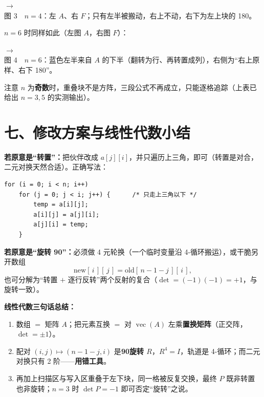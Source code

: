 \documentclass[11pt,a4paper,UTF8]{ctexart}
\begin{document}
\begin{center}
\begin{minipage}{0.96\linewidth}
\centering
{\footnotesize
\MatAfour \hspace{0.5cm}$\longrightarrow$\hspace{0.5cm}\MatFfour}\\[2pt]
{\small 图 3\ \ $n=4$：左 $A$、右 $F$；只有左半被搬动，右上不动，右下为左上块的 180\textdegree。}
\end{minipage}
\end{center}

$n=6$ 时同样如此（左图 $A$，右图 $F$）：
\begin{center}
\begin{minipage}{0.96\linewidth}
\centering
{\footnotesize
\MatA \hspace{0.35cm}$\longrightarrow$\hspace{0.35cm}\MatF}\\[2pt]
{\small 图 4\ \ $n=6$：蓝色左半来自 $A$ 的下半（翻转为行、再转置成列），右侧为“右上原样、右下 180\textdegree”。}
\end{minipage}
\end{center}

注意 $n$ 为\textbf{奇数}时，重叠块不是方阵，三段公式不再成立，只能逐格追踪（上表已给出 $n=3,5$ 的实测输出）。

\section*{七、修改方案与线性代数小结}

\begin{keybox}
\textbf{若原意是“转置”：}把伙伴改成 $a[j][i]$，并只遍历上三角，即可（转置是对合，二元对换天然合适）。正确写法：
\end{keybox}
\begin{lstlisting}
for (i = 0; i < n; i++)
    for (j = 0; j < i; j++) {      /* 只走上三角以下 */
        temp = a[i][j];
        a[i][j] = a[j][i];
        a[j][i] = temp;
    }
\end{lstlisting}
\begin{keybox}
\textbf{若原意是“旋转 90\textdegree”：}必须做 4 元轮换（一个临时变量沿 4-循环搬运），或干脆另开数组
\[
\text{new}[\,i\,][\,j\,]=\text{old}[\,n-1-j\,][\,i\,],
\]
也可分解为“转置 $+$ 逐行反转”两个反射的复合（$\det=(-1)(-1)=+1$，与旋转一致）。
\end{keybox}

\begin{warnbox}
\textbf{线性代数三句话总结：}
\begin{enumerate}
\item 数组 $=$ 矩阵 $A$；把元素互换 $=$ 对 $\operatorname{vec}(A)$ 左乘\textbf{置换矩阵}（正交阵，$\det=\pm1$）。
\item 配对 $(i,j)\mapsto(n{-}1{-}j,i)$ 是\textbf{90\textdegree 旋转 $R$}，$R^{4}=I$，轨道是 4-循环；而二元对换只有 2 阶——\textbf{用错工具}。
\item 再加上扫描区与写入区重叠于左下块，同一格被反复交换，最终 $P$ 既非转置也非旋转；$n=3$ 时 $\det P=-1$ 即可否定“旋转”之说。
\end{enumerate}
\end{warnbox}
\end{document}
